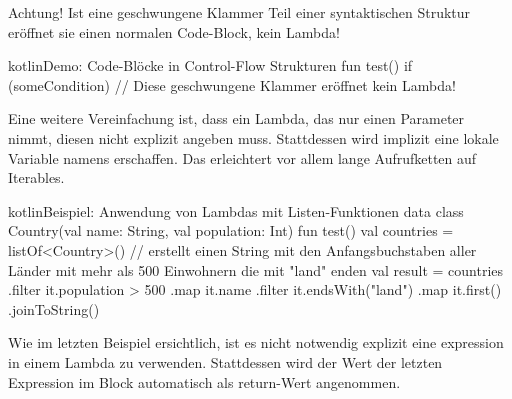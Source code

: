 Achtung!
Ist eine geschwungene Klammer Teil einer syntaktischen Struktur eröffnet sie einen normalen Code-Block, kein Lambda!

\begin{codeBlock}{kotlin}{Demo: Code-Blöcke in Control-Flow Strukturen}
fun test() {
    if (someCondition) { // Diese geschwungene Klammer eröffnet kein Lambda!
    }
}
\end{codeBlock}

Eine weitere Vereinfachung ist, dass ein Lambda, das nur einen Parameter nimmt, diesen nicht explizit angeben muss.
Stattdessen wird implizit eine lokale Variable namens  erschaffen.
Das erleichtert vor allem lange Aufrufketten auf Iterables.

\begin{codeBlock}{kotlin}{Beispiel: Anwendung von Lambdas mit Listen-Funktionen}
data class Country(val name: String, val population: Int)
fun test() {
    val countries = listOf<Country>()
    // erstellt einen String mit den Anfangsbuchstaben aller Länder mit mehr als 500 Einwohnern die mit "land" enden
    val result = countries
        .filter { it.population > 500 }
        .map { it.name }
        .filter { it.endsWith("land") }
        .map { it.first() }
        .joinToString()
}
\end{codeBlock}

Wie im letzten Beispiel ersichtlich, ist es nicht notwendig explizit eine  expression in einem
Lambda zu verwenden.
Stattdessen wird der Wert der letzten Expression im Block automatisch als return-Wert angenommen.

\renewcommand{\kapitelautor}{}
